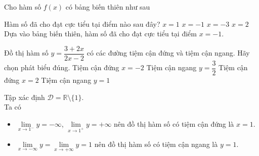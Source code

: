 \begin{ex}%
Cho hàm số $f(x)$ có bảng biến thiên như sau
\begin{center}
\end{center}
Hàm số đã cho đạt cực tiểu tại điểm nào sau đây?
\choice
{$x=1$}
{\True $x=-1$}
{$x=-3$}
{$x=2$}
\loigiai
{Dựa vào bảng biến thiên, hàm số đã cho đạt cực tiểu tại điểm $x=-1$.
}
\end{ex}

\begin{ex}%
Đồ thị hàm số $y=\dfrac{3+2x}{2x-2}$ có các đường tiệm cận đứng và tiệm cận ngang. Hãy chọn phát biểu đúng.
\choice
{Tiệm cận đứng $x=-2$}
{Tiệm cận ngang $y=\dfrac{3}{2}$}
{Tiệm cận đứng $x=2$}
{\True Tiệm cận ngang $y=1$}
\loigiai
{Tập xác định $\mathscr{D}=\mathbb{R}\setminus \{1\}$.\\
Ta có
\begin{itemize}
\item $\lim\limits_{x\to 1^-}y=-\infty$, $\lim\limits_{x\to 1^+}y=+\infty$ nên đồ thị hàm số có tiệm cận đứng là $x=1$.
\item $\lim\limits_{x\to -\infty} y=\lim\limits_{x\to +\infty} y=1$ nên đồ thị hàm số có tiệm cận ngang là $y=1$.
\end{itemize}
}
\end{ex}

